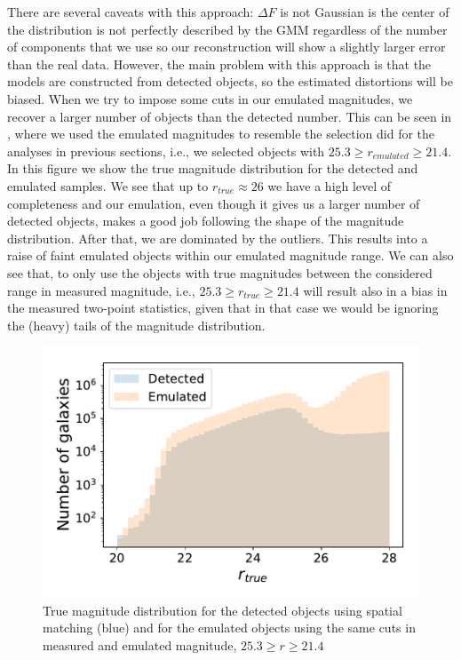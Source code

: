 \documentclass[\docopts]{\docclass}
\begin{document}
There are several caveats with this approach: $\Delta F$ is not Gaussian is the center of the distribution is not perfectly described by the GMM regardless of the number of components that we use so our reconstruction will show a slightly larger error than the real data. However, the main problem with this approach is that the models are constructed from detected objects, so the estimated distortions will be biased. When we try to impose some cuts in our emulated magnitudes, we recover a larger number of objects than the detected number. This can be seen in , where we used the emulated magnitudes to resemble the selection did for the analyses in previous sections, i.e., we selected objects with $25.3 \geq r_{emulated} \geq 21.4$. In this figure we show the true magnitude distribution for the detected and emulated samples. We see that up to $r _{true} \approx 26$ we have a high level of completeness and our emulation, even though it gives us a larger number of detected objects, makes a good job following the shape of the magnitude distribution. After that, we are dominated by the outliers. This results into a raise of faint emulated objects within our emulated magnitude range. We can also see that, to only use the objects with true magnitudes between the considered range in measured magnitude, i.e., $25.3 \geq r_{true} \geq 21.4$ will result also in a bias in the measured two-point statistics, given that in that case we would be ignoring the (heavy) tails of the magnitude distribution.
\begin{figure}
\centering
\includegraphics[width=0.9\columnwidth]{emulated_magnitude_histogram}
\caption{True magnitude distribution for the detected objects using spatial matching (blue) and for the emulated objects using the same cuts in measured and emulated magnitude, $25.3 \geq r \geq 21.4$}
\label{fig:emulated_magnitudes}
\end{figure}
\end{document}
